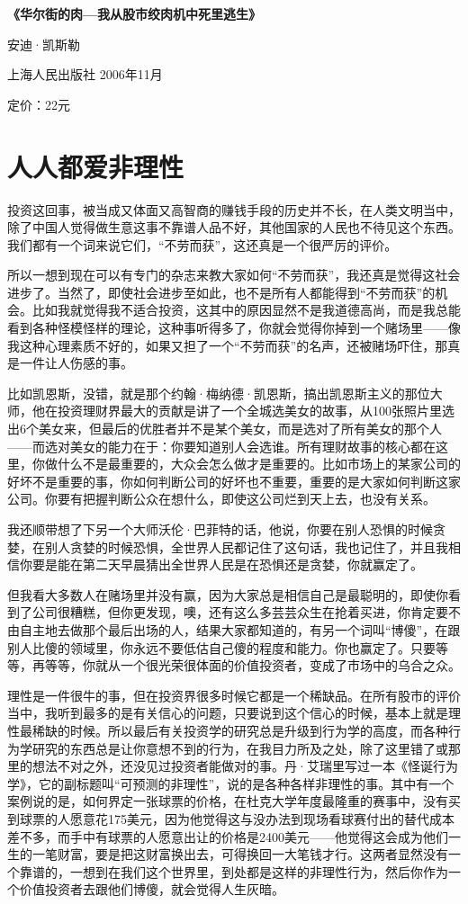 \textbf{《华尔街的肉---我从股市绞肉机中死里逃生》}

安迪·凯斯勒

上海人民出版社 2006年11月

定价：22元

\hypertarget{ux4ebaux4ebaux90fdux7231ux975eux7406ux6027}{%
\section{人人都爱非理性}\label{ux4ebaux4ebaux90fdux7231ux975eux7406ux6027}}

投资这回事，被当成又体面又高智商的赚钱手段的历史并不长，在人类文明当中，除了中国人觉得做生意这事不靠谱人品不好，其他国家的人民也不待见这个东西。我们都有一个词来说它们，``不劳而获''，这还真是一个很严厉的评价。

所以一想到现在可以有专门的杂志来教大家如何``不劳而获''，我还真是觉得这社会进步了。当然了，即使社会进步至如此，也不是所有人都能得到``不劳而获''的机会。比如我就觉得我不适合投资，这其中的原因显然不是我道德高尚，而是我总能看到各种怪模怪样的理论，这种事听得多了，你就会觉得你掉到一个赌场里------像我这种心理素质不好的，如果又担了一个``不劳而获''的名声，还被赌场吓住，那真是一件让人伤感的事。

比如凯恩斯，没错，就是那个约翰·梅纳德·凯恩斯，搞出凯恩斯主义的那位大师，他在投资理财界最大的贡献是讲了一个全城选美女的故事，从100张照片里选出6个美女来，但最后的优胜者并不是某个美女，而是选对了所有美女的那个人------而选对美女的能力在于：你要知道别人会选谁。所有理财故事的核心都在这里，你做什么不是最重要的，大众会怎么做才是重要的。比如市场上的某家公司的好坏不是重要的事，你如何判断公司的好坏也不重要，重要的是大家如何判断这家公司。你要有把握判断公众在想什么，即使这公司烂到天上去，也没有关系。

我还顺带想了下另一个大师沃伦·巴菲特的话，他说，你要在别人恐惧的时候贪婪，在别人贪婪的时候恐惧，全世界人民都记住了这句话，我也记住了，并且我相信你要是能在第二天早晨猜出全世界人民是在恐惧还是贪婪，你就赢定了。

但我看大多数人在赌场里并没有赢，因为大家总是相信自己是最聪明的，即使你看到了公司很糟糕，但你更发现，噢，还有这么多芸芸众生在抢着买进，你肯定要不由自主地去做那个最后出场的人，结果大家都知道的，有另一个词叫``博傻''，在跟别人比傻的领域里，你永远不要低估自己傻的程度和能力。你也赢定了。只要等等，再等等，你就从一个很光荣很体面的价值投资者，变成了市场中的乌合之众。

理性是一件很牛的事，但在投资界很多时候它都是一个稀缺品。在所有股市的评价当中，我听到最多的是有关信心的问题，只要说到这个信心的时候，基本上就是理性最稀缺的时候。所以最后有关投资学的研究总是升级到行为学的高度，而各种行为学研究的东西总是让你意想不到的行为，在我目力所及之处，除了这里错了或那里的想法不对之外，还没见过投资者能做对的事。丹·艾瑞里写过一本《怪诞行为学》，它的副标题叫``可预测的非理性''，说的是各种各样非理性的事。其中有一个案例说的是，如何界定一张球票的价格，在杜克大学年度最隆重的赛事中，没有买到球票的人愿意花175美元，因为他觉得这与没办法到现场看球赛付出的替代成本差不多，而手中有球票的人愿意出让的价格是2400美元------他觉得这会成为他们一生的一笔财富，要是把这财富换出去，可得换回一大笔钱才行。这两者显然没有一个靠谱的，一想到在我们这个世界里，到处都是这样的非理性行为，然后你作为一个价值投资者去跟他们博傻，就会觉得人生灰暗。

